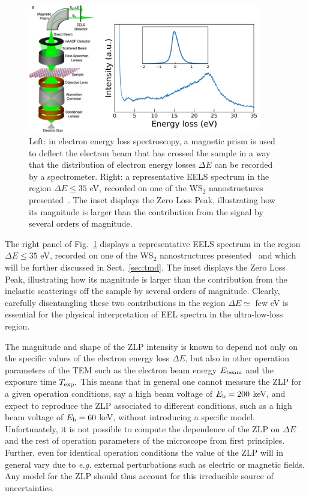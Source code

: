 \begin{figure}[t]
    \centering
    \includegraphics[width=0.9\textwidth]{plots/EELS.pdf}
    \caption{Left: in electron energy loss spectroscopy, a magnetic
      prism is used to deflect the electron beam that has crossed the sample
      in a way that the distribution of electron energy losses $\Delta E$ can be recorded
      by a spectrometer.
      Right: a representative EELS spectrum in the region $\Delta E \le 35$ eV, recorded
      on one of the WS$_2$ nanostructures presented~\cite{SabryaWS2}.
      The inset displays the Zero Loss Peak, illustrating how
      its magnitude is larger than the contribution from the signal by several
      orders of magnitude.
      }
    \label{fig:EELS}
\end{figure}

The right panel of Fig.~\ref{fig:EELS} displays
a representative EELS spectrum in the region $\Delta E \le 35$ eV, recorded
on one of the WS$_2$ nanostructures presented~\cite{SabryaWS2}
and which will be further discussed in Sect.~\ref{sec:tmd}.
The inset displays the Zero Loss Peak, illustrating how
its magnitude is larger than the contribution from the inelastic scatterings
off the sample by several
orders of magnitude.
%
Clearly, carefully disentangling these two contributions in the region $\Delta E \simeq$ few eV
is essential for the physical interpretation of EEL spectra in the ultra-low-loss region.

The magnitude and shape of the ZLP intensity is known to depend not only on the specific values
of the electron energy loss $\Delta E$, but also in other operation parameters
of the TEM such as the electron beam energy $E_{\rm beam}$ and the exposure time
$T_{\rm exp}.$
%
This means that in general one cannot measure the ZLP for a given operation
conditions, say a high beam voltage of $E_{\rm b}=200$ keV, and expect to reproduce
the ZLP associated to different conditions, such as a  high beam voltage of $E_{\rm b}=60$ keV,
without introducing a specific model.
%
Unfortunately, it is not possible to compute the dependence of the ZLP on $\Delta E$
and the rest of operation parameters of the microscope from first principles.
%
Further, even for identical operation conditions the value of the ZLP
will in general vary due to {\it e.g.} external perturbations such as electric or magnetic fields.
%
Any model for the ZLP should thus account for this irreducible source of uncertainties.

